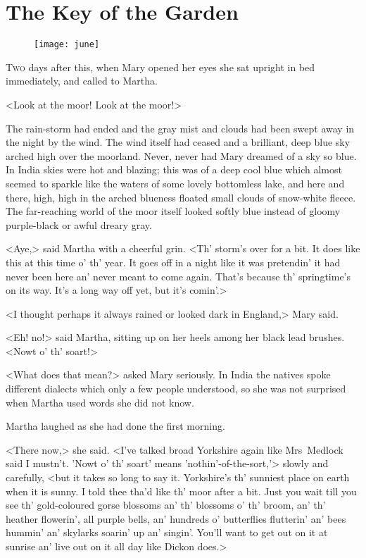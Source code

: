 \chapter{The Key of the Garden} 
	
\begin{figure}[t!]
\centering
\texttt{[image: june]}
\end{figure}

 \lettrine[]{T}{wo} days after this, when Mary opened her eyes she sat upright in bed immediately, and called to Martha.

\zz
<Look at the moor! Look at the moor!>

\zz
The rain-storm had ended and the gray mist and clouds had been swept away in the night by the wind. The wind itself had ceased and a brilliant, deep blue sky arched high over the moorland. Never, never had Mary dreamed of a sky so blue. In India skies were hot and blazing; this was of a deep cool blue which almost seemed to sparkle like the waters of some lovely bottomless lake, and here and there, high, high in the arched blueness floated small clouds of snow-white fleece. The far-reaching world of the moor itself looked softly blue instead of gloomy purple-black or awful dreary gray.

<Aye,> said Martha with a cheerful grin. <Th' storm's over for a bit. It does like this at this time o' th' year. It goes off in a night like it was pretendin' it had never been here an' never meant to come again. That's because th' springtime's on its way. It's a long way off yet, but it's comin'.>

<I thought perhaps it always rained or looked dark in England,> Mary said.

<Eh! no!> said Martha, sitting up on her heels among her black lead brushes. <Nowt o' th' soart!>

<What does that mean?> asked Mary seriously. In India the natives spoke different dialects which only a few people understood, so she was not surprised when Martha used words she did not know.

Martha laughed as she had done the first morning.

<There now,> she said. <I've talked broad Yorkshire again like Mrs~Medlock said I mustn't. 'Nowt o' th' soart' means 'nothin'-of-the-sort,'> slowly and carefully, <but it takes so long to say it. Yorkshire's th' sunniest place on earth when it is sunny. I told thee tha'd like th' moor after a bit. Just you wait till you see th' gold-coloured gorse blossoms an' th' blossoms o' th' broom, an' th' heather flowerin', all purple bells, an' hundreds o' butterflies flutterin' an' bees hummin' an' skylarks soarin' up an' singin'. You'll want to get out on it at sunrise an' live out on it all day like Dickon does.>

